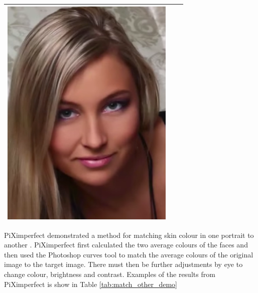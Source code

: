 \begin{table}[H]
\begin{tabular}{|c|c|c|}
\begin{minipage}{.29\textwidth}
    \includegraphics[width=\textwidth,height=\textheight,keepaspectratio]{images/match_body_res}
  \end{minipage} \\
    \hline
\end{tabular}
\end{table}

PiXimperfect demonstrated a method for matching skin colour in one portrait to another \cite{photoshop:match_other}. PiXimperfect first calculated the two average colours of the faces and then used the Photoshop curves tool to match the average colours of the original image to the target image. There must then be further adjustments by eye to change colour, brightness and contrast. Examples of the results from PiXimperfect is show in Table \ref{tab:match_other_demo}

